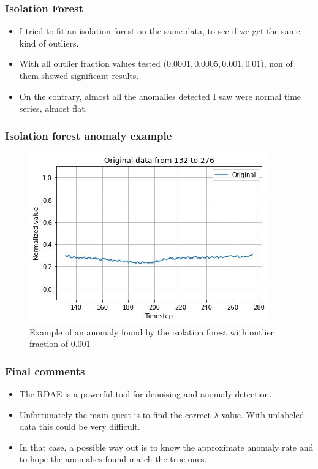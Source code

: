 \documentclass{beamer}
\theoremstyle{plain}
\theoremstyle{definition}
\theoremstyle{remark}
\begin{document}
\begin{frame}
	\frametitle{Isolation Forest}
	\begin{itemize}
		\item I tried to fit an isolation forest on the same data, to see if we get the same kind of outliers.
		\item With all outlier fraction values tested ($0.0001, 0.0005, 0.001, 0.01$), non of them showed significant results.
		\item On the contrary, almost all the anomalies detected I saw were normal time series, almost flat.
	\end{itemize}
\end{frame}

\begin{frame}
	\frametitle{Isolation forest anomaly example}
	\begin{figure}
		\centering
		\includegraphics[width=0.7\linewidth]{Images/anom_if0.001pos132.jpg}
		\caption[]{Example of an anomaly found by the isolation forest with outlier fraction of $0.001$}
	\end{figure}
\end{frame}

\begin{frame}
	\frametitle{Final comments}
	\begin{itemize}
		\item The RDAE is a powerful tool for denoising and anomaly detection.
		\item Unfortunately the main quest is to find the correct $\lambda$ value. With unlabeled data this could be very difficult.
		\item In that case, a possible way out is to know the approximate anomaly rate and to hope the anomalies found match the true ones.
	\end{itemize}
\end{frame}
\end{document}
